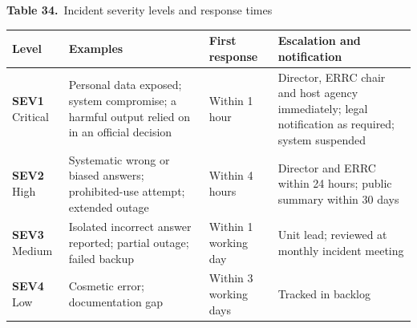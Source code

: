 \documentclass[border=10pt]{standalone}
\begin{document}
\begin{minipage}{17cm}
{\large\bfseries Table 34.}\ {\large Incident severity levels and response times}\par\vspace{7pt}
\small
{}
\begin{tabularx}{\linewidth}{@{}>{\hsize=0.565\hsize\raggedright\arraybackslash}X>{\hsize=1.600\hsize\raggedright\arraybackslash}X>{\hsize=0.659\hsize\raggedright\arraybackslash}X>{\hsize=1.176\hsize\raggedright\arraybackslash}X@{}}
\arrayrulecolor{bapilrule}\toprule
\rowcolor{white}\textbf{Level} & \textbf{Examples} & \textbf{First response} & \textbf{Escalation and notification} \\
\midrule
\textbf{SEV1} Critical & Personal data exposed; system compromise; a harmful output relied on in an official decision & Within 1 hour & Director, ERRC chair and host agency immediately; legal notification as required; system suspended \\
\textbf{SEV2} High & Systematic wrong or biased answers; prohibited-use attempt; extended outage & Within 4 hours & Director and ERRC within 24 hours; public summary within 30 days \\
\textbf{SEV3} Medium & Isolated incorrect answer reported; partial outage; failed backup & Within 1 working day & Unit lead; reviewed at monthly incident meeting \\
\textbf{SEV4} Low & Cosmetic error; documentation gap & Within 3 working days & Tracked in backlog \\
\bottomrule
\end{tabularx}
\par{}
\end{minipage}
\end{document}
